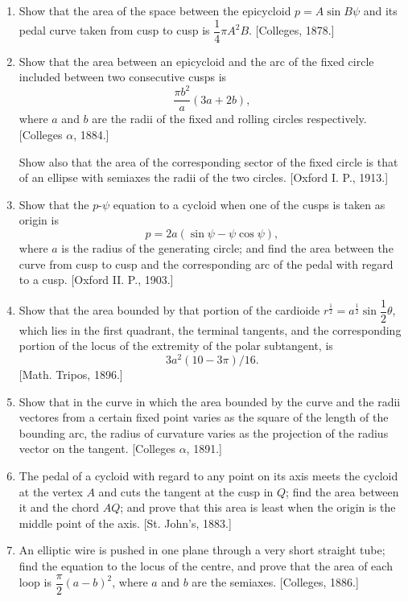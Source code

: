\documentclass[11pt, a4paper]{article}
\newcommand{\source}[1]{\hfill\textnormal{[#1]}}
\begin{document}
\begin{enumerate}[leftmargin=2em]
\item Show that the area of the space between the epicycloid $p=A\sin B\psi$ and its pedal curve taken from cusp to cusp is $\dfrac14\pi A^2B$. \source{Colleges, 1878.}

\item Show that the area between an epicycloid and the arc of the fixed circle included between two consecutive cusps is
\[
\frac{\pi b^2}{a}(3a+2b),
\]
where $a$ and $b$ are the radii of the fixed and rolling circles respectively. \source{Colleges $\alpha$, 1884.}

Show also that the area of the corresponding sector of the fixed circle is that of an ellipse with semiaxes the radii of the two circles. \source{Oxford I. P., 1913.}

\item Show that the $p$-$\psi$ equation to a cycloid when one of the cusps is taken as origin is
\[
p=2a(\sin\psi-\psi\cos\psi),
\]
where $a$ is the radius of the generating circle; and find the area between the curve from cusp to cusp and the corresponding arc of the pedal with regard to a cusp. \source{Oxford II. P., 1903.}

\item Show that the area bounded by that portion of the cardioide $r^{\frac12}=a^{\frac12}\sin\dfrac12\theta$, which lies in the first quadrant, the terminal tangents, and the corresponding portion of the locus of the extremity of the polar subtangent, is
\[
3a^2(10-3\pi)/16.
\]
\source{Math. Tripos, 1896.}

\item Show that in the curve in which the area bounded by the curve and the radii vectores from a certain fixed point varies as the square of the length of the bounding arc, the radius of curvature varies as the projection of the radius vector on the tangent. \source{Colleges $\alpha$, 1891.}

\item The pedal of a cycloid with regard to any point on its axis meets the cycloid at the vertex $A$ and cuts the tangent at the cusp in $Q$; find the area between it and the chord $AQ$; and prove that this area is least when the origin is the middle point of the axis. \source{St. John's, 1883.}

\item An elliptic wire is pushed in one plane through a very short straight tube; find the equation to the locus of the centre, and prove that the area of each loop is $\dfrac{\pi}{2}(a-b)^2$, where $a$ and $b$ are the semiaxes. \source{Colleges, 1886.}


\end{enumerate}
\end{document}
